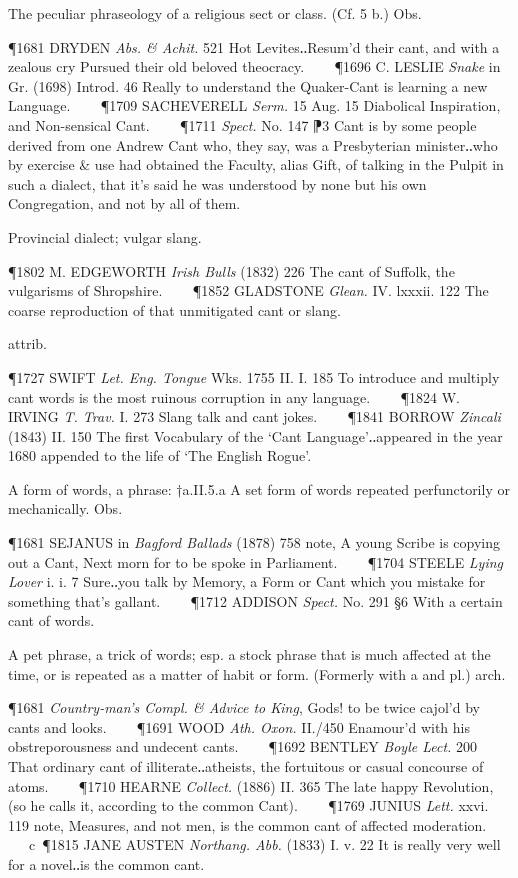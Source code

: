 \begin{description}[wide, labelwidth=!, labelindent=0pt]
\begin{myenumerate}
 The peculiar phraseology of a religious sect or class. (Cf. 5 b.) Obs.

\P 1681 DRYDEN  \textit{Abs. \& Achit.} 521 Hot Levites‥Resum'd their cant, and with a zealous cry Pursued their old beloved theocracy.    
\P 1696 C. LESLIE  \textit{Snake} in Gr. (1698) Introd. 46 Really to understand the Quaker-Cant is learning a new Language.    
\P 1709 SACHEVERELL  \textit{Serm.} 15 Aug. 15 Diabolical Inspiration, and Non-sensical Cant.    
\P 1711  \textit{Spect.} No. 147 ⁋3 Cant is by some people derived from one Andrew Cant who, they say, was a Presbyterian minister‥who by exercise \& use had obtained the Faculty, alias Gift, of talking in the Pulpit in such a dialect, that it's said he was understood by none but his own Congregation, and not by all of them.

 Provincial dialect; vulgar slang.

\P 1802 M. EDGEWORTH  \textit{Irish Bulls} (1832) 226 The cant of Suffolk, the vulgarisms of Shropshire.    
\P 1852 GLADSTONE  \textit{Glean.} IV. lxxxii. 122 The coarse reproduction of that unmitigated cant or slang.

 attrib.

\P 1727 SWIFT  \textit{Let. Eng. Tongue} Wks. 1755 II. I. 185  To introduce and multiply cant words is the most ruinous corruption in any language.    
\P 1824 W. IRVING  \textit{T. Trav.} I. 273 Slang talk and cant jokes.    
\P 1841 BORROW  \textit{Zincali} (1843) II. 150 The first Vocabulary of the ‘Cant Language’‥appeared in the year 1680 appended to the life of ‘The English Rogue’.

 A form of words, a phrase: †a.II.5.a A set form of words repeated perfunctorily or mechanically. Obs.

\P 1681 SEJANUS in \textit{Bagford Ballads} (1878) 758 note, A young Scribe is copying out a Cant, Next morn for to be spoke in Parliament.    
\P 1704 STEELE  \textit{Lying Lover} i. i. 7 Sure‥you talk by Memory, a Form or Cant which you mistake for something that's gallant.    
\P 1712 ADDISON  \textit{Spect.} No. 291 §6 With a certain cant of words.

 A pet phrase, a trick of words; esp. a stock phrase that is much affected at the time, or is repeated as a matter of habit or form. (Formerly with a and pl.) arch.

\P 1681 \textit{Country-man's  Compl. \& Advice to King}, Gods! to be twice cajol'd by cants and looks.    
\P 1691 WOOD  \textit{Ath. Oxon.} II./450 Enamour'd with his obstreporousness and undecent cants.    
\P 1692 BENTLEY  \textit{Boyle Lect.} 200 That ordinary cant of illiterate‥atheists, the fortuitous or casual concourse of atoms.    
\P 1710 HEARNE  \textit{Collect.} (1886) II. 365 The late happy Revolution, (so he calls it, according to the common Cant).    
\P 1769 JUNIUS  \textit{Lett.} xxvi. 119 note, Measures, and not men, is the common cant of affected moderation.    c 
\P 1815 JANE AUSTEN  \textit{Northang. Abb.} (1833) I. v. 22 It is really very well for a novel‥is the common cant.


\end{myenumerate}
\end{description}
